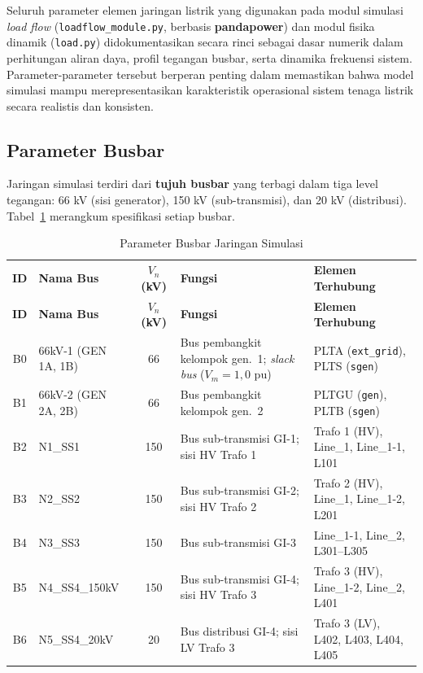 Seluruh parameter elemen jaringan listrik yang digunakan pada modul simulasi \textit{load flow} (\texttt{loadflow\_module.py}, berbasis \textbf{pandapower}) dan modul fisika dinamik (\texttt{load.py}) didokumentasikan secara rinci sebagai dasar numerik dalam perhitungan aliran daya, profil tegangan busbar, serta dinamika frekuensi sistem. Parameter-parameter tersebut berperan penting dalam memastikan bahwa model simulasi mampu merepresentasikan karakteristik operasional sistem tenaga listrik secara realistis dan konsisten.

\subsection{Parameter Busbar}
\label{subsec:Parameter_Busbar}

Jaringan simulasi terdiri dari \textbf{tujuh busbar} yang terbagi dalam tiga level tegangan: 66 kV (sisi generator), 150 kV (sub-transmisi), dan 20 kV (distribusi).
Tabel~\ref{tab:busbar} merangkum spesifikasi setiap busbar.

\begin{longtable}{|c|p{2.8cm}|c|p{4.8cm}|p{3.2cm}|}
    \caption{Parameter Busbar Jaringan Simulasi}
    \label{tab:busbar}
    \vspace{-0.75em}\\
    \hline
    \textbf{ID} & \textbf{Nama Bus} & \textbf{$V_n$ (kV)} & \textbf{Fungsi} & \textbf{Elemen Terhubung} \\ \hline
    \endfirsthead
    \hline
    \textbf{ID} & \textbf{Nama Bus} & \textbf{$V_n$ (kV)} & \textbf{Fungsi} & \textbf{Elemen Terhubung} \\ \hline
    \endhead
    B0 & 66kV-1 (GEN 1A, 1B) & 66  & Bus pembangkit kelompok gen.\ 1; \textit{slack bus} ($V_m = 1{,}0$ pu) & PLTA (\texttt{ext\_grid}), PLTS (\texttt{sgen}) \\ \hline
    B1 & 66kV-2 (GEN 2A, 2B) & 66  & Bus pembangkit kelompok gen.\ 2 & PLTGU (\texttt{gen}), PLTB (\texttt{sgen}) \\ \hline
    B2 & N1\_SS1              & 150 & Bus sub-transmisi GI-1; sisi HV Trafo 1 & Trafo 1 (HV), Line\_1, Line\_1-1, L101 \\ \hline
    B3 & N2\_SS2              & 150 & Bus sub-transmisi GI-2; sisi HV Trafo 2 & Trafo 2 (HV), Line\_1, Line\_1-2, L201 \\ \hline
    B4 & N3\_SS3              & 150 & Bus sub-transmisi GI-3 & Line\_1-1, Line\_2, L301--L305 \\ \hline
    B5 & N4\_SS4\_150kV       & 150 & Bus sub-transmisi GI-4; sisi HV Trafo 3 & Trafo 3 (HV), Line\_1-2, Line\_2, L401 \\ \hline
    B6 & N5\_SS4\_20kV        & 20  & Bus distribusi GI-4; sisi LV Trafo 3 & Trafo 3 (LV), L402, L403, L404, L405 \\ \hline
\end{longtable}

